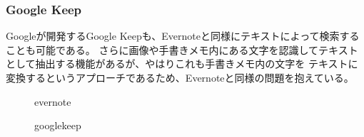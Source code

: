 \subsubsection{Google Keep}



Googleが開発するGoogle Keepも、Evernoteと同様にテキストによって検索することも可能である。
さらに画像や手書きメモ内にある文字を認識してテキストとして抽出する機能があるが、やはりこれも手書きメモ内の文字を
テキストに変換するというアプローチであるため、Evernoteと同様の問題を抱えている。

\begin{figure}[htbp] \begin{minipage}{0.5\hsize}
                         \begin{center} 
                         \end{center} \caption{evernote} \label{fig:evernote}
\end{minipage} \begin{minipage}{0.5\hsize}
                   \begin{center} 
                   \end{center} \caption{googlekeep} \label{fig:googlekeep}
\end{minipage}
\end{figure}

